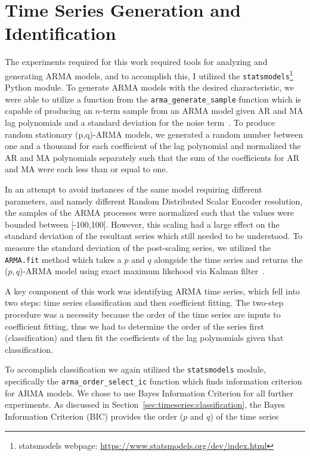 \documentclass[oneside,12pt,openany]{book}
\begin{document}
	\section{Time Series Generation and Identification}\label{sec:exp:timeseriesclass}
    
    The experiments required for this work required tools for analyzing and generating ARMA models, and to accomplish this, I utilized the \texttt{statsmodels}\footnote{statsmodels webpage: \href{https://www.statsmodels.org/dev/index.html}{https://www.statsmodels.org/dev/index.html}} Python module. To generate ARMA models with the desired characteristic, we were able to utilize a function from the \texttt{arma\_generate\_sample} function which is capable of producing an $n$-term sample from an ARMA model given AR and MA lag polynomials and a standard deviation for the noise term~\cite{statsmodels}. To produce random stationary (p,q)-ARMA models, we generated a random number between one and a thousand for each coefficient of the lag polynomial and normalized the AR and MA polynomials separately such that the sum of the coefficients for AR and MA were each less than or equal to one.
    
    In an attempt to avoid instances of the same model requiring different parameters, and namely different Random Distributed Scalar Encoder resolution, the samples of the ARMA processes were normalized such that the values were bounded between [-100,100]. However, this scaling had a large effect on the standard deviation of the resultant series which still needed to be understood. To measure the standard deviation of the post-scaling series, we utilized the \texttt{ARMA.fit} method which takes a $p$ and $q$ alongside the time series and returns the ($p,q$)-ARMA model using exact maximum likehood via Kalman filter~\cite{statsmodels}. 
    
	A key component of this work was identifying ARMA time series, which fell into two steps: time series classification and then coefficient fitting. The two-step procedure was a necessity because the order of the time series are inputs to coefficient fitting, thus we had to determine the order of the series first (classification) and then fit the coefficients of the lag polynomials given that classification. 
    
    To accomplish classification we again utilized the \texttt{statsmodels} module, specifically the \texttt{arma\_order\_select\_ic} function which finds information criterion for ARMA models. We chose to use Bayes Information Criterion for all further experiments. As discussed in Section~\ref{sec:timeseries:classification}, the Bayes Information Criterion (BIC) provides the order ($p$ and $q$) of the time series
    
\end{document}
